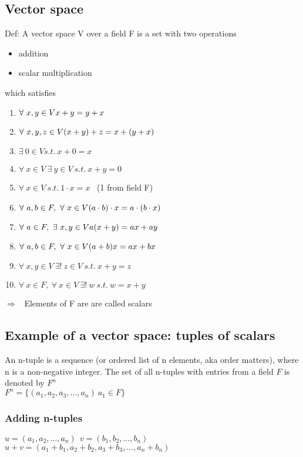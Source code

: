 \documentclass[11pt]{scrartcl}
\begin{document}
\subsection{Vector space}
Def: A vector space V over a field F is a set with two operations
\begin{itemize}
	\item{addition}
	\item {scalar multiplication}
\end{itemize}
which satisfies
\begin{enumerate}
	\item{$\forall \ x,y \in V \\ x + y = y + x$}
	\item{$\forall \ x,y,z \in V \\ (x + y) + z = x + (y + x)$}
	\item{$\exists \ 0 \in V s.t. \ x + 0 = x $}
	\item{$\forall \ x \in V\ \exists \ y \in V\ s.t. \ x + y = 0$}
	\item{$\forall \ x \in V \ s.t. \ 1 \cdot x = x$ \ (1 from field F)}
	\item{$\forall \ a,b \in F, \  \forall \ x \in V \\ (a \cdot b) \cdot x = a \cdot ( b \cdot x)$}
	\item{$\forall \ a \in F, \ \exists \ x,y \in V \\ a(x + y) = ax + ay$}
	\item{$\forall \ a,b \in F, \ \forall \ x \in V \\ (a + b)x = ax + bx $}
	\item{$\forall \ x,y \in V\ \exists ! \ z \in V\ s.t. \ x + y = z$}
	\item{$\forall \ x \in F,\ \forall \ x \in V \ \exists ! \ w \ s.t. \ w = x + y$}
\end{enumerate}

$\Rightarrow$ \ Elements of F are are called scalars

\subsection{Example of a vector space: tuples of scalars}
An n-tuple is a sequence (or ordered list of n elements, aka order matters), where n is a non-negative integer. The set of all n-tuples with entries from a field $F$ is denoted by $F^n$\\
$F^n = \{(a_1, a_2, a_3, \dots, a_n) \ a_1 \in F\}$
\subsubsection{Adding n-tuples}
$u = (a_1, a_2,\dots, a_n) \ \ v = (b_1, b_2,\dots, b_n) $\\
$u + v = (a_1 + b_1, a_2 + b_2, a_3 + b_3, \dots, a_n + b_n)$
\end{document}
